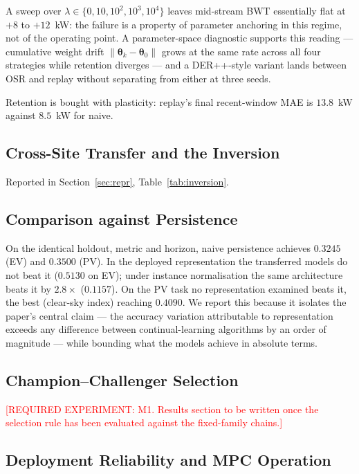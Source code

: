 \documentclass[journal]{IEEEtran}
\newcommand{\params}{\boldsymbol{\theta}}
\newcommand{\ewclambda}{\lambda}
\newcommand{\needexp}[1]{\textcolor{red}{[REQUIRED EXPERIMENT: #1]}}
\begin{document}
A sweep over $\ewclambda \in \{0,10,10^2,10^3,10^4\}$ leaves mid-stream BWT
essentially flat at $+8$ to $+12$~kW: the failure is a property of parameter
anchoring in this regime, not of the operating point. A parameter-space
diagnostic supports this reading --- cumulative weight drift
$\lVert\params_k-\params_0\rVert$ grows at the same rate across all four
strategies while retention diverges --- and a DER++-style variant lands between
OSR and replay without separating from either at three seeds.

Retention is bought with plasticity: replay's final recent-window MAE is
$13.8$~kW against $8.5$~kW for naive.

\subsection{Cross-Site Transfer and the Inversion}
Reported in Section~\ref{sec:repr}, Table~\ref{tab:inversion}.

\subsection{Comparison against Persistence}
\label{sec:persistence}
On the identical holdout, metric and horizon, naive persistence achieves
$0.3245$ (EV) and $0.3500$ (PV). In the deployed representation the transferred
models do not beat it ($0.5130$ on EV); under instance normalisation the same
architecture beats it by $2.8\times$ ($0.1157$). On the PV task no
representation examined beats it, the best (clear-sky index) reaching $0.4090$.
We report this because it isolates the paper's central claim --- the accuracy
variation attributable to representation exceeds any difference between
continual-learning algorithms by an order of magnitude --- while bounding what
the models achieve in absolute terms.

\subsection{Champion--Challenger Selection}
\needexp{M1. Results section to be written once the selection rule has been
evaluated against the fixed-family chains.}

\subsection{Deployment Reliability and MPC Operation}
\end{document}
